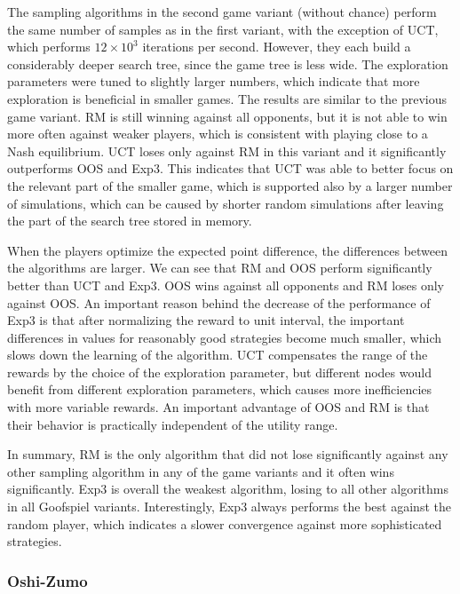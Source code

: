 {The sampling algorithms in the second game variant (without chance) perform 
the same number of samples as in the first variant, with the exception of UCT, which performs $12 \times 10^3$ iterations per second.
However, they each build a considerably deeper search tree, since the game tree is less wide.
The exploration parameters were tuned to slightly larger numbers, which indicate that more exploration is beneficial in smaller games.
The results are similar to the previous game variant.
RM is still winning against all opponents, but it is not able to win more often against weaker players, which is consistent with playing close to a Nash equilibrium.
UCT loses only against RM in this variant and it significantly outperforms OOS and Exp3.
This indicates that UCT was able to better focus on the relevant part of the smaller game, which is supported also by a larger number of simulations, which can be caused by shorter random simulations after leaving the part of the search tree stored in memory.

When the players optimize the expected point difference, the differences between the algorithms are larger. 
We can see that RM and OOS perform significantly better than UCT and Exp3.
OOS wins against all opponents and RM loses only against OOS.
An important reason behind the decrease of the performance of Exp3 is that after normalizing the reward to unit interval, the important differences in values for reasonably good strategies become much smaller, which slows down the learning of the algorithm.
UCT compensates the range of the rewards by the choice of the exploration parameter, but different nodes would benefit from different exploration parameters, which causes more inefficiencies with more variable rewards.
An important advantage of OOS and RM is that their behavior is practically independent of the utility range.

In summary, RM is the only algorithm that did not lose significantly against any other sampling algorithm in any of the game variants and it often wins significantly.
Exp3 is overall the weakest algorithm, losing to all other algorithms in all Goofspiel variants.
Interestingly, Exp3 always performs the best against the random player, which indicates a slower convergence against more sophisticated strategies.}

\subsubsection{Oshi-Zumo}

